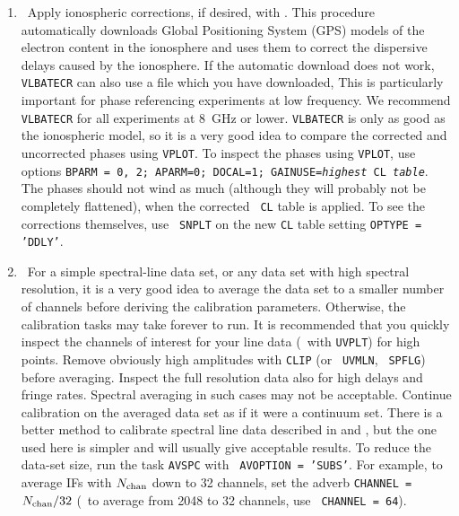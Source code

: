 \begin{enumerate}
\item\ {Apply ionospheric corrections, if desired, with
{\tt {}}\@.  This procedure automatically downloads
Global Positioning System (GPS) models of the electron content in the
ionosphere and uses them to correct the dispersive delays caused by
the ionosphere.  If the automatic download does not work,  {\tt
  VLBATECR} can also use a file which you have downloaded,  This
is particularly important for phase referencing experiments at low
frequency.  We recommend {\tt VLBATECR} for all experiments at 8~GHz
or lower. {\tt VLBATECR} is only as good as the ionospheric model, so
it is a very good idea to compare the corrected and uncorrected phases
using {\tt VPLOT}\@.  To inspect the phases using {\tt VPLOT}, use
options {\tt BPARM = 0, 2; APARM=0; DOCAL=1; GAINUSE={\it highest} CL
  {\it table}}\@.  The phases should not wind as much (although they
will probably not be completely flattened), when the corrected {\tt
  CL} table is applied.  To see the corrections themselves, use {\tt
  SNPLT} on the new {\tt CL} table setting {\tt OPTYPE =
  'DDLY'}\@.}

\item\ {For a simple spectral-line data set, or any data set with high
spectral resolution, it is a very good idea to average the data set
to a smaller number of channels before deriving the calibration
parameters.  Otherwise, the calibration tasks may take forever to run.
It is recommended that you quickly inspect the channels of interest
for your line data (\eg\ with {\tt UVPLT}\@) for high points. Remove
obviously high amplitudes with {\tt CLIP} (or \eg\ {\tt UVMLN}, {\tt
  SPFLG}) before averaging.  Inspect the full resolution data also for
high delays and fringe rates.  Spectral averaging in such cases may
not be acceptable.  Continue calibration on the averaged data set as
if it were a continuum set.  There is a better method to calibrate
spectral line data described in  and , but
the one used here is simpler and will usually give acceptable results.
To reduce the data-set size, run the task {\tt AVSPC} with {\tt
  AVOPTION = 'SUBS'}\@.  For example, to average IFs with $N_{\rm
  chan}$ down to 32 channels, set the adverb {\tt CHANNEL = $N_{\rm
    chan}/32$} (\eg\ to average from 2048 to 32 channels, use {\tt
  CHANNEL = 64}\@).}

\end{enumerate}


